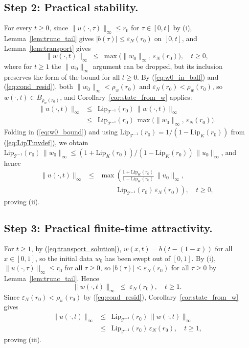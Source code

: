 \documentclass[10pt,a4paper]{amsart}
\newcommand{\Tcal}{\mathcal{T}}
\newcommand{\Lipk}{\mathrm{Lip}_K}
\newcommand{\LipT}{\mathrm{Lip}_{\Tcal^{-1}}}
\newcommand{\Bball}{\overline{B}}
\newcommand{\eps}{\varepsilon}
\begin{document}
\subsection*{Step 2: Practical stability.}

For every $t \ge 0$, since $\|u(\cdot,\tau)\|_\infty \le r_0$ for $\tau \in [0,t]$ by (i), Lemma~\ref{lem:trunc_tail} gives $|b(\tau)| \le \eps_N(r_0)$ on $[0,t]$, and Lemma~\ref{lem:transport} gives
\begin{equation}
\|w(\cdot, t)\|_\infty \;\le\; \max\bigl(\|w_0\|_\infty,\, \eps_N(r_0)\bigr), \quad t \ge 0,
\label{eq:wnorm_allt}
\end{equation}
where for $t \ge 1$ the $\|w_0\|_\infty$ argument can be dropped, but its inclusion preserves the form of the bound for all $t \ge 0$. By (\ref{eq:w0_in_ball}) and (\ref{eq:cond_resid}), both $\|w_0\|_\infty < \rho_w(r_0)$ and $\eps_N(r_0) < \rho_w(r_0)$, so $w(\cdot, t) \in \Bball_{\rho_w(r_0)}$, and Corollary~\ref{cor:state_from_w} applies:
\begin{eqnarray}
\|u(\cdot, t)\|_\infty &\le& \LipT(r_0)\,\|w(\cdot, t)\|_\infty \nonumber \\
&\le& \LipT(r_0)\,\max\bigl(\|w_0\|_\infty,\, \eps_N(r_0)\bigr).
\label{eq:proof_ii_w}
\end{eqnarray}
Folding in (\ref{eq:w0_bound}) and using $\LipT(r_0) = 1/(1-\Lipk(r_0))$ from (\ref{eq:LipTinvdef}), we obtain $\LipT(r_0)\,\|w_0\|_\infty \le (1+\Lipk(r_0))/(1-\Lipk(r_0))\,\|u_0\|_\infty$, and hence
\begin{eqnarray}
\|u(\cdot, t)\|_\infty &\le& \max\!\left(\frac{1 + \Lipk(r_0)}{1 - \Lipk(r_0)}\,\|u_0\|_\infty,\right. \nonumber \\
&& \quad\quad\;\; \left.\LipT(r_0)\,\eps_N(r_0)\right), \quad t \ge 0,
\label{eq:proof_ii}
\end{eqnarray}
proving (ii).

\subsection*{Step 3: Practical finite-time attractivity.}

For $t \ge 1$, by (\ref{eq:transport_solution}), $w(x, t) = b(t - (1-x))$ for all $x \in [0,1]$, so the initial data $w_0$ has been swept out of $[0,1]$. By (i), $\|u(\cdot, \tau)\|_\infty \le r_0$ for all $\tau \ge 0$, so $|b(\tau)| \le \eps_N(r_0)$ for all $\tau \ge 0$ by Lemma~\ref{lem:trunc_tail}. Hence
\begin{equation}
\|w(\cdot, t)\|_\infty \;\le\; \eps_N(r_0), \quad t \ge 1.
\label{eq:wnorm_t1}
\end{equation}
Since $\eps_N(r_0) < \rho_w(r_0)$ by (\ref{eq:cond_resid}), Corollary~\ref{cor:state_from_w} gives
\begin{eqnarray}
\|u(\cdot, t)\|_\infty &\le& \LipT(r_0)\,\|w(\cdot, t)\|_\infty \nonumber \\
&\le& \LipT(r_0)\,\eps_N(r_0), \quad t \ge 1,
\label{eq:proof_iii}
\end{eqnarray}
proving (iii).
\end{document}
